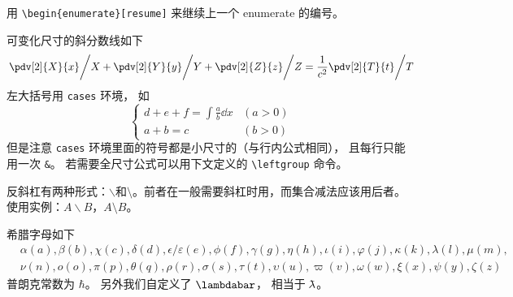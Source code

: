 用 \verb|\begin{enumerate}[resume]|  来继续上一个 enumerate 的编号。

可变化尺寸的斜分数线如下
\begin{equation}
\left. \pdv[2]{X}{x} \middle/ X + \pdv[2]{Y}{y} \middle/ Y + \pdv[2]{Z}{z} \middle/ Z  = \frac{1}{c^2}  \pdv[2]{T}{t} \middle/ T\right.
\end{equation}
左大括号用 \verb|cases| 环境， 如
\begin{equation}
\begin{cases}
d+e+f = \int \frac{a}{b} \dd{x} &(a > 0)\\
a+b = c &(b > 0)
\end{cases}
\end{equation}
但是注意 \verb|cases| 环境里面的符号都是小尺寸的（与行内公式相同）， 且每行只能用一次 \verb|&|。 若需要全尺寸公式可以用下文定义的 \verb|\leftgroup| 命令。

反斜杠有两种形式：$\backslash$和$\setminus$。前者在一般需要斜杠时用，而集合减法应该用后者。使用实例：$A\backslash B$，$A\setminus B$。

希腊字母如下
\begin{equation}
\begin{aligned}
&\alpha (a), \beta (b), \chi (c), \delta (d), \epsilon/\varepsilon (e), \phi (f), \gamma (g),
\eta (h), \iota (i), \varphi (j), \kappa (k), \lambda (l), \mu (m),\\
& \nu (n), o (o), \pi (p), \theta (q), \rho (r), \sigma (s), \tau (t), \upsilon (u), \varpi (v), \omega (w), \xi (x), \psi (y), \zeta (z)
\end{aligned}
\end{equation}
普朗克常数为 $\hbar$。 另外我们自定义了 $\lambdabar$， 相当于 $\mkern-0.25mu {\bar{\phantom{a}}} \mkern -10.2mu\lambda$。

